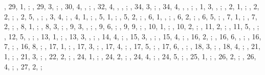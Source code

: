 \begin{autindex}
    , 29,  1, ;
    , 29,  3, ;
    , 30,  4, , ;
    , 32,  4, , , ;
    , 34,  3, ;
    , 34,  4, , , ;
    ,  1, 3, , ;
    ,  2, 1, ;
    ,  2, 2, ;
    ,  2, 5, , ;
    ,  3, 4, ;
    ,  4, 1, ;
    ,  5, 1, ;
    ,  5, 2, ;
    ,  6, 1, , ;
    ,  6, 2, ;
    ,  6, 5, ;
    ,  7, 1, ;
    ,  7, 2, ;
    ,  8, 1, ;
    ,  8, 3, ;
    ,  9, 3, , ;
    ,  9, 6, ;
    ,  9, 9, ;
    , 10, 1, ;
    , 10, 2, ;
    , 11, 2, ;
    , 11, 5, , ;
    , 12, 5, , ;
    , 13, 1, ;
    , 13, 3, , ;
    , 14, 4, ;
    , 15, 3, , ;
    , 15, 4, ;
    , 16, 2, ;
    , 16, 6, , ;
    , 16, 7, ;
    , 16, 8, ;
    , 17, 1, ;
    , 17, 3, ;
    , 17, 4, ;
    , 17, 5, ;
    , 17, 6, , ;
    , 18, 3, ;
    , 18, 4, ;
    , 21, 1, ;
    , 21, 3, ;
    , 22, 2, ;
    , 24, 1, ;
    , 24, 2, ;
    , 24, 4, ;
    , 24, 5, ;
    , 25, 1, ;
    , 26, 2, ;
    , 26, 4, ;
    , 27, 2, ;


\end{autindex}
